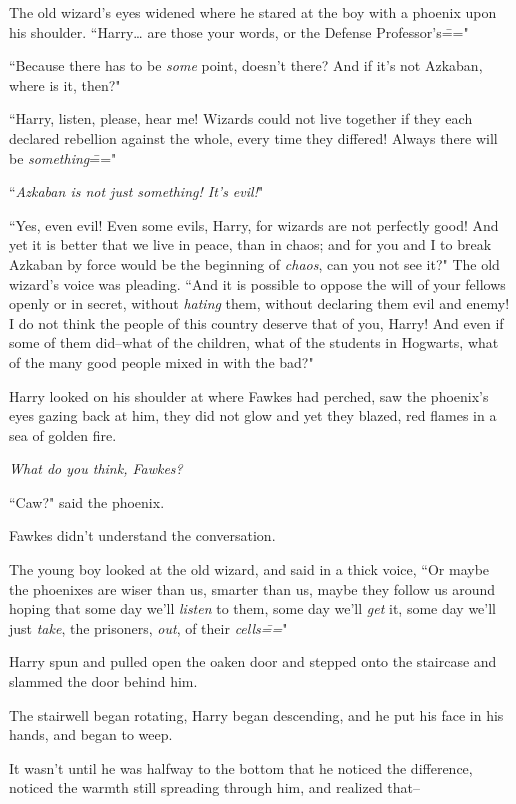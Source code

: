 The old wizard's eyes widened where he stared at the boy with a phoenix upon his shoulder. ``Harry{\ldots} are those your words, or the Defense Professor's\==="

``Because there has to be \emph{some} point, doesn't there? And if it's not Azkaban, where is it, then?"

``Harry, listen, please, hear me! Wizards could not live together if they each declared rebellion against the whole, every time they differed! Always there will be \emph{something}\==="

``\emph{Azkaban is not just something! It's evil!}"

``Yes, even evil! Even some evils, Harry, for wizards are not perfectly good! And yet it is better that we live in peace, than in chaos; and for you and I to break Azkaban by force would be the beginning of \emph{chaos}, can you not see it?" The old wizard's voice was pleading. ``And it is possible to oppose the will of your fellows openly or in secret, without \emph{hating} them, without declaring them evil and enemy! I do not think the people of this country deserve that of you, Harry! And even if some of them did\---what of the children, what of the students in Hogwarts, what of the many good people mixed in with the bad?"

Harry looked on his shoulder at where Fawkes had perched, saw the phoenix's eyes gazing back at him, they did not glow and yet they blazed, red flames in a sea of golden fire.

\emph{What do you think, Fawkes?}

``Caw?" said the phoenix.

Fawkes didn't understand the conversation.

The young boy looked at the old wizard, and said in a thick voice, ``Or maybe the phoenixes are wiser than us, smarter than us, maybe they follow us around hoping that some day we'll \emph{listen} to them, some day we'll \emph{get} it, some day we'll just \emph{take}, the prisoners, \emph{out}, of their \emph{cells\===}"

Harry spun and pulled open the oaken door and stepped onto the staircase and slammed the door behind him.

The stairwell began rotating, Harry began descending, and he put his face in his hands, and began to weep.

It wasn't until he was halfway to the bottom that he noticed the difference, noticed the warmth still spreading through him, and realized that\---

